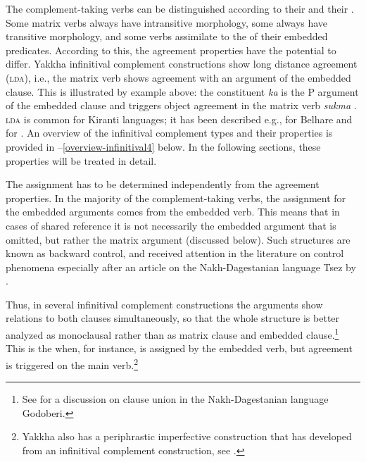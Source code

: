  The complement-taking verbs can be distinguished according to their  and their . Some matrix verbs always have intransitive morphology, some always have transitive morphology, and some verbs assimilate to the  of their embedded predicates.   According  to this, the agreement properties have the potential to differ. Yakkha infinitival complement constructions show long distance agreement (\textsc{lda}), i.e., the matrix verb shows agreement with an argument of the embedded clause. This is illustrated  by example \LLast[b] above: the constituent \emph{ka}  is the P argument of the embedded clause and triggers object agreement in the matrix verb \emph{sukma} . \textsc{lda} is common for Kiranti languages; it has been described  e.g., for Belhare \citep{Bickeletal2001Syntactic, Bickel2004Hidden} and for  \citep{Schackow2008Clause}. An overview of the infinitival complement types and their properties is provided in --\ref{overview-infinitival4} below. In the following sections, these properties will be treated in detail.
 
The  assignment has to be determined independently from the agreement properties. In the majority of the complement-taking verbs, the  assignment for the embedded arguments comes from the embedded verb. This means that in cases of shared reference it is not necessarily the embedded argument that is omitted, but rather the matrix argument (discussed below). Such structures are known as backward control, and received attention in the literature on control phenomena especially after an article on the Nakh-Dagestanian language Tsez by \citet{Polinskyetal2002_Backward}. 

Thus, in several infinitival complement constructions the arguments show relations to both clauses simultaneously, so that the whole structure is better analyzed as monoclausal rather than as matrix clause and embedded clause.\footnote{See \citet{Haspelmath1999Long-distance} for a discussion on clause union in the Nakh-Dagestanian language Godoberi.}  This is the  when, for instance,   is assigned by the embedded verb, but agreement is triggered on the  main verb.\footnote{Yakkha also has a periphrastic imperfective construction that  has developed from an infinitival complement construction, see .}  



